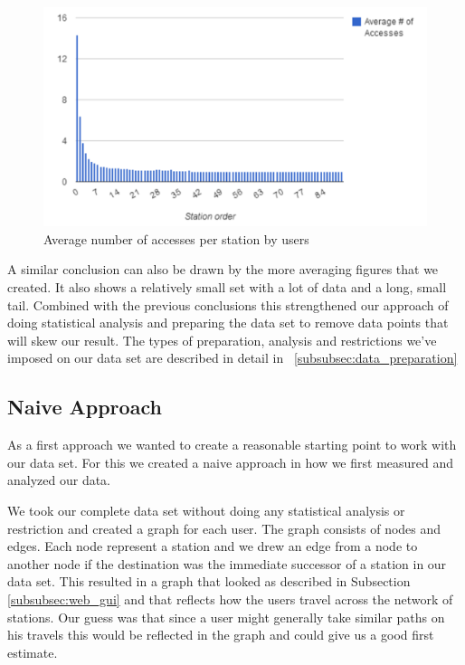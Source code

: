 \begin{figure}[!ht]
	\caption{Average number of accesses per station by users}
	\centering
	\includegraphics[width=1.0\textwidth]{charts/number_stations_average_user}
\end{figure}

A similar conclusion can also be drawn by the more averaging figures that we created. It also shows a relatively small set with a lot of data and a long, small tail. Combined with the previous conclusions this strengthened our approach of doing statistical analysis and preparing the data set to remove data points that will skew our result. The types of preparation, analysis and restrictions we've imposed on our data set are described in detail in ~\ref{subsubsec:data_preparation}

\subsection{Naive Approach}

As a first approach we wanted to create a reasonable starting point to work with our data set. For this we created a naive approach in how we first measured and analyzed our data. 

We took our complete data set without doing any statistical analysis or restriction and created a graph for each user. The graph consists of nodes and edges. Each node represent a station and we drew an edge from a node to another node if the destination was the immediate successor of a station in our data set. This resulted in a graph that looked as described in Subsection \ref{subsubsec:web_gui} and that reflects how the users travel across the network of stations. Our guess was that since a user might generally take similar paths on his travels this would be reflected in the graph and could give us a good first estimate.


